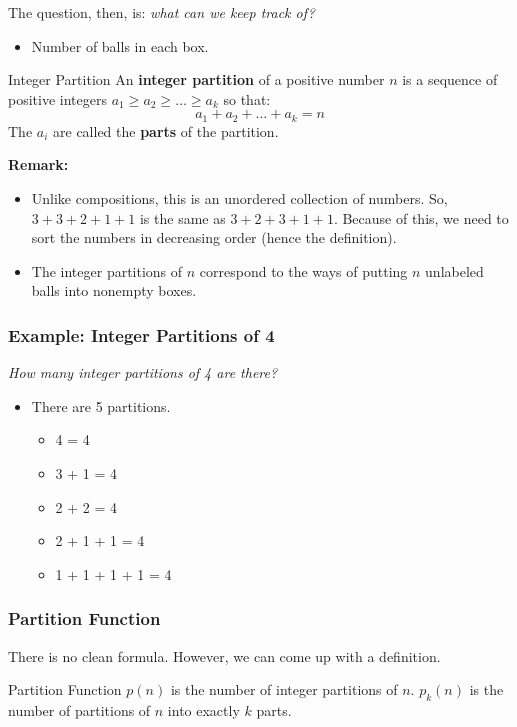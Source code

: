 \documentclass[letterpaper]{article}
\begin{document}
The question, then, is: \emph{what can we keep track of?}
\begin{itemize}
    \item Number of balls in each box.
\end{itemize}

\begin{definition}{Integer Partition}{}
    An \textbf{integer partition} of a positive number $n$ is a sequence of positive integers $a_1 \geq a_2 \geq \dots \geq a_k$ so that:
    \[a_1 + a_2 + \dots + a_k = n\]
    The $a_i$ are called the \textbf{parts} of the partition.  
\end{definition} 
\textbf{Remark:} 
\begin{itemize}
    \item Unlike compositions, this is an unordered collection of numbers. So, $3 + 3 + 2 + 1 + 1$ is the same as $3 + 2 + 3 + 1 + 1$. Because of this, we need to sort the numbers in decreasing order (hence the definition). 
    \item The integer partitions of $n$ correspond to the ways of putting $n$ unlabeled balls into nonempty boxes. 
\end{itemize}

\subsubsection{Example: Integer Partitions of 4}
\emph{How many integer partitions of 4 are there?}

\begin{itemize}
    \item There are 5 partitions. 
    \begin{itemize}
        \item 4 = 4
        \item 3 + 1 = 4
        \item 2 + 2 = 4
        \item 2 + 1 + 1 = 4
        \item 1 + 1 + 1 + 1 = 4
    \end{itemize}
\end{itemize}

\subsubsection{Partition Function}
There is no clean formula. However, we can come up with a definition.
\begin{definition}{Partition Function}{}
    $p(n)$ is the number of integer partitions of $n$. $p_{k}(n)$ is the number of partitions of $n$ into exactly $k$ parts. 
\end{definition}
\end{document}
